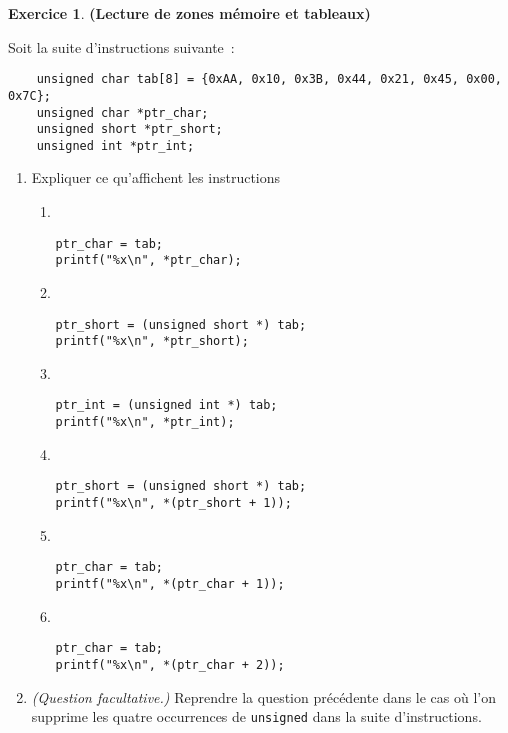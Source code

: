 \documentclass[12pt]{article}
\theoremstyle{definition}
\newtheorem{Exercice}{Exercice}
\begin{document}
\begin{Exercice} {\bf (Lecture de zones mémoire et tableaux)}\smallskip

Soit la suite d'instructions suivante~:
\begin{lstlisting}
    unsigned char tab[8] = {0xAA, 0x10, 0x3B, 0x44, 0x21, 0x45, 0x00, 0x7C};
    unsigned char *ptr_char;
    unsigned short *ptr_short;
    unsigned int *ptr_int;
\end{lstlisting}
\begin{enumerate}
    \item Expliquer ce qu'affichent les instructions
    \begin{multicols}{2}
    \begin{enumerate}
        \item ~
\begin{lstlisting}
ptr_char = tab;
printf("%x\n", *ptr_char);
\end{lstlisting}
    \smallskip

    \item ~
\begin{lstlisting}
ptr_short = (unsigned short *) tab;
printf("%x\n", *ptr_short);
\end{lstlisting}
    \smallskip

    \item ~
\begin{lstlisting}
ptr_int = (unsigned int *) tab;
printf("%x\n", *ptr_int);
\end{lstlisting}
    \smallskip

    \item ~
\begin{lstlisting}
ptr_short = (unsigned short *) tab;
printf("%x\n", *(ptr_short + 1));
\end{lstlisting}
    \smallskip

    \item ~
\begin{lstlisting}
ptr_char = tab;
printf("%x\n", *(ptr_char + 1));
\end{lstlisting}
    \smallskip

    \item ~
\begin{lstlisting}
ptr_char = tab;
printf("%x\n", *(ptr_char + 2));
\end{lstlisting}
    \end{enumerate}
    \end{multicols}

    \item {\em (Question facultative.)} Reprendre la question
    précédente dans le cas où l'on supprime les quatre occurrences
    de {\tt unsigned} dans la suite d'instructions.
\end{enumerate}
\end{Exercice}
\bigskip
\end{document}
